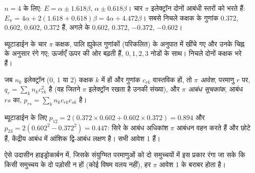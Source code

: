 \begin{example}[ब्यूटाडाईन]\label{ex:b2:huckel:butadiene}
$n = 4$ के लिए: $E = \alpha \pm 1.618\beta$, $\alpha \pm 0.618\beta$। चार $\pi$ इलेक्ट्रॉन दोनों
आबंधी स्तरों को भरते हैं: $E_\pi = 4\alpha + 2(1.618 + 0.618)\beta = 4\alpha + 4.472\beta$। सबसे निचले
कक्षक के गुणांक 0.372, 0.602, 0.602, 0.372 हैं, अगले के 0.602, 0.372,
$-0.372$, $-0.602$।
\end{example}

\begin{omfigure}

{\small ब्यूटाडाईन के चार $\pi$ कक्षक, पालि ह्युकेल
गुणांकों (परिकलित) के अनुपात में खींचे गए और उनके चिह्न के अनुसार रंगे गए; ऊर्जाएँ ऊपर की ओर
बढ़ती हैं, $0, 1, 2, 3$ नोडों के साथ। निचले दोनों कक्षक भरे हैं।}
\end{omfigure}

\begin{definition}[$\pi$ आवेश और आबंध सूचकांक]\label{def:b2:huckel:indices}
जब $n_k$ इलेक्ट्रॉन (0, 1 या 2) कक्षक $k$ में हों और गुणांक $c_{rk}$ वास्तविक हों, तो
\emph{$\pi$ आवेश}, परमाणु $r$ पर, $q_r = \sum_k n_kc_{rk}^2$ है (वह जितने
$\pi$ इलेक्ट्रॉन रखता है उनकी संख्या), और \emph{$\pi$ आबंध सूचकांक},
आबंध $rs$ का, $p_{rs} = \sum_k n_kc_{rk}c_{sk}$ है।
\end{definition}

ब्यूटाडाईन के लिए $p_{12} = 2(0.372 \times 0.602 + 0.602 \times 0.372) = 0.894$ और $p_{23} =
2(0.602^2 - 0.372^2) = 0.447$: सिरे के आबंध अधिकांश $\pi$ आबंधन वहन करते हैं और
छोटे हैं, केंद्रीय आबंध में आंशिक द्वि-आबंध लक्षण है। सभी आवेश
1 हैं।

\begin{proposition}[एकांतरी हाइड्रोकार्बन]\label{prop:b2:huckel:alternant}
ऐसे उदासीन हाइड्रोकार्बन में, जिसके संयुग्मित परमाणुओं को दो समुच्चयों में इस प्रकार रंगा जा सके
कि किसी समुच्चय के दो पड़ोसी न हों (कोई विषम वलय नहीं), हर $\pi$ आवेश 1 के बराबर होता है।
\end{proposition}


